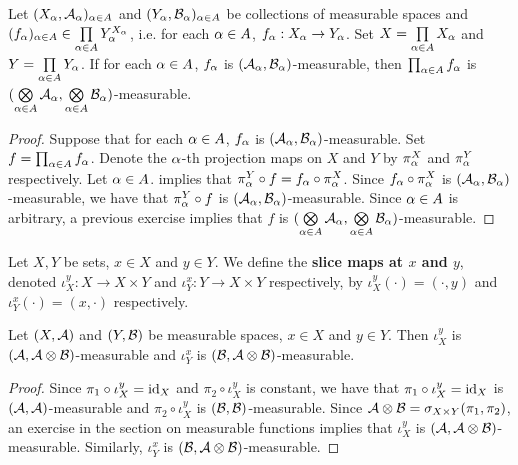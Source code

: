 \documentclass{book}
\begin{document}
	\begin{ex} 
		Let $(X_{\alpha}, \mathcal{A}_{\alpha})_{\alpha \in A}$ and $(Y_{\alpha}, \mathcal{B}_{\alpha})_{\alpha \in A}$ be collections of measurable spaces and $(f_{\alpha})_{\alpha \in A} \in \prod\limits_{\alpha \in A} Y_{\alpha}^{X_{\alpha}}$, i.e. for each $\alpha \in A$, $f_{\alpha}:X_{\alpha} \rightarrow Y_{\alpha}$. Set $X = \prod\limits_{\alpha \in A} X_{\alpha}$ and $Y = \prod\limits_{\alpha \in A}Y_{\alpha}$. If for each $\alpha \in A$, $f_{\alpha}$ is $(\mathcal{A}_{\alpha}, \mathcal{B}_{\alpha})$-measurable, then $\prod_{\alpha \in A} f_{\alpha}$ is $(\bigotimes\limits_{\alpha \in A} \mathcal{A}_{\alpha}, \bigotimes\limits_{\alpha \in A} \mathcal{B}_{\alpha})$-measurable.
	\end{ex}
	
	\begin{proof} Suppose that for each $\alpha \in A$, $f_{\alpha}$ is $(\mathcal{A}_{\alpha}, \mathcal{B}_{\alpha})$-measurable. Set $f = \prod_{\alpha \in A} f_{\alpha}$. Denote the $\alpha$-th projection maps on $X$ and $Y$ by $\pi^X_{\alpha}$ and $\pi^Y_{\alpha}$ respectively. Let $\alpha \in A$.   implies that $\pi^Y_{\alpha} \circ f = f_{\alpha} \circ \pi^X_{\alpha}$. Since $f_{\alpha} \circ \pi^X_{\alpha}$ is $(\mathcal{A}_{\alpha}, \mathcal{B}_{\alpha})$-measurable, we have that $\pi^Y_{\alpha} \circ f$ is $(\mathcal{A}_{\alpha}, \mathcal{B}_{\alpha})$-measurable. Since $\alpha \in A$ is arbitrary, a previous exercise implies that $f$ is $(\bigotimes\limits_{\alpha \in A} \mathcal{A}_{\alpha}, \bigotimes\limits_{\alpha \in A} \mathcal{B}_{\alpha})$-measurable.
		
	\end{proof}

	\begin{defn} 
		Let $X, Y$ be sets, $x \in X$ and $y \in Y$. We define the \textbf{slice maps at $x$ and $y$}, denoted $\iota^y_X: X \rightarrow X \times Y$ and $\iota^x_Y: Y \rightarrow X \times Y$ respectively, by $\iota^y_X(\cdot) = (\cdot, y)$ and $\iota^x_Y(\cdot) = (x, \cdot)$ respectively. 
	\end{defn}
	
	\begin{ex} 
		Let $(X, \mathcal{A} )$ and $(Y, \mathcal{B})$ be measurable spaces, $x \in X$ and $y \in Y$. Then $\iota^y_X$ is $(\mathcal{A}, \mathcal{A} \otimes \mathcal{B})$-measurable and $\iota^x_Y$  is $(\mathcal{B}, \mathcal{A} \otimes \mathcal{B})$-measurable.
	\end{ex}
	
	\begin{proof}
		Since $\pi_1 \circ \iota^y_X = \operatorname{id}_{X}$ and $\pi_2 \circ \iota^y_X$ is constant, we have that $\pi_1 \circ \iota^y_X = \operatorname{id}_{X}$ is $(\mathcal{A}, \mathcal{A})$-measurable and $\pi_2 \circ \iota^y_X$ is $(\mathcal{B}, \mathcal{B})$-measurable. Since $\mathcal{A} \otimes \mathcal{B} = \sigma_{X \times Y}(\pi_1, \pi_2)$, an exercise in the section on measurable functions implies that $\iota^y_X$ is $(\mathcal{A}, \mathcal{A} \otimes \mathcal{B})$-measurable. Similarly, $\iota^x_Y$ is $(\mathcal{B}, \mathcal{A} \otimes \mathcal{B})$-measurable.
	\end{proof}
	
\end{document}
